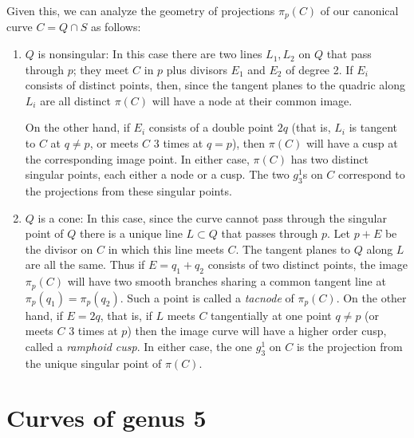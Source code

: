 Given this, we can analyze the geometry of projections $\pi_p(C)$ of our canonical curve $C = Q \cap S$ as follows:

\begin{enumerate}
\item $Q$ is nonsingular:
In this case there are two lines $L_1, L_2$ on $Q$ that pass through $p$; they meet $C$ in $p$ plus divisors $E_1$ and $E_2$ of degree 2. If $E_i$ consists of distinct points, then, since the tangent planes to the quadric along $L_i$ are all distinct $\pi(C)$ will have a node at their common image. 


On the other hand, if $E_i$ consists of a double point $2q$ (that is, $L_i$ is tangent to $C$ at $q\neq p$, or meets $C$ 3 times at $q = p$), then $\pi(C)$ will have a cusp at the corresponding image point. 
In either case, $\pi(C)$ has two distinct singular points, each either a node or a cusp. The two $g^1_3$s on $C$ correspond to the projections from these singular points.

\item $Q$ is a cone:
In this case, since the curve cannot pass through the singular point of $Q$ there is a unique line $L\subset Q$ that passes through $p$. Let $p+E$ be the divisor on $C$ in which this line meets $C$. The tangent planes to $Q$ along $L$ are all the same. Thus if $E = q_1+q_2$ consists of two distinct points, the image $\pi_p(C)$ will have two smooth branches sharing a common tangent line at
$\pi_p(q_1) = \pi_p(q_2)$. Such a point is called a \emph{tacnode} of $\pi_p(C)$. On the other hand, if $E= 2q$, that is, if $L$ meets $C$ tangentially at one point $q\neq p$ (or meets $C$ 3 times at $p$) then the image curve will have a higher order cusp, called a \emph{ramphoid cusp}. In either case, the one $g^1_3$ on $C$ is the projection from the unique singular point of $\pi(C)$.
\end{enumerate}



\section{Curves of genus 5}

